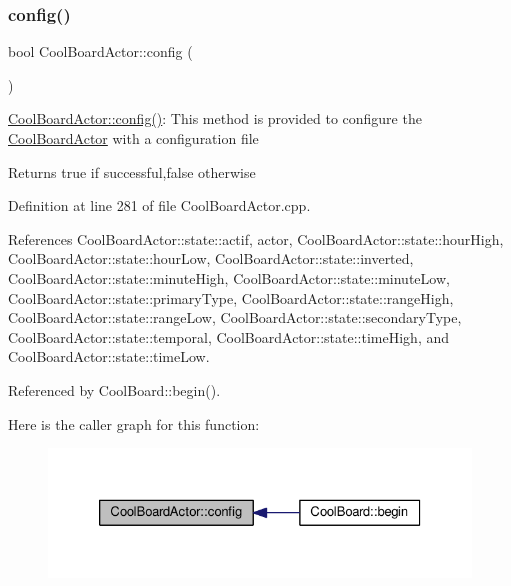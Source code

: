 \subsubsection{\texorpdfstring{config()}{config()}}
{\footnotesize\ttfamily bool Cool\+Board\+Actor\+::config (\begin{DoxyParamCaption}{ }\end{DoxyParamCaption})}

\hyperlink{class_cool_board_actor_a5af5538fc7d169f63127e06d5219bcd4}{Cool\+Board\+Actor\+::config()}\+: This method is provided to configure the \hyperlink{class_cool_board_actor}{Cool\+Board\+Actor} with a configuration file

\begin{DoxyReturn}{Returns}
true if successful,false otherwise 
\end{DoxyReturn}


Definition at line 281 of file Cool\+Board\+Actor.\+cpp.



References Cool\+Board\+Actor\+::state\+::actif, actor, Cool\+Board\+Actor\+::state\+::hour\+High, Cool\+Board\+Actor\+::state\+::hour\+Low, Cool\+Board\+Actor\+::state\+::inverted, Cool\+Board\+Actor\+::state\+::minute\+High, Cool\+Board\+Actor\+::state\+::minute\+Low, Cool\+Board\+Actor\+::state\+::primary\+Type, Cool\+Board\+Actor\+::state\+::range\+High, Cool\+Board\+Actor\+::state\+::range\+Low, Cool\+Board\+Actor\+::state\+::secondary\+Type, Cool\+Board\+Actor\+::state\+::temporal, Cool\+Board\+Actor\+::state\+::time\+High, and Cool\+Board\+Actor\+::state\+::time\+Low.



Referenced by Cool\+Board\+::begin().

Here is the caller graph for this function\+:\nopagebreak
\begin{figure}[H]
\begin{center}
\leavevmode
\includegraphics[width=326pt]{dc/d69/class_cool_board_actor_a5af5538fc7d169f63127e06d5219bcd4_icgraph}
\end{center}
\end{figure}
\mbox{\label{class_cool_board_actor_aabb10e7aebc3249ffc940530de29f84a}} 
